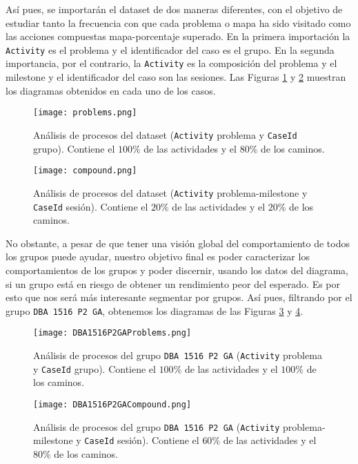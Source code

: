 Así pues, se importarán el dataset de dos maneras diferentes, con el objetivo de estudiar tanto la frecuencia con que cada problema o mapa ha sido visitado como las acciones compuestas mapa-porcentaje superado. En la primera importación la \texttt{Activity} es el problema y el identificador del caso es el grupo. En la segunda importancia, por el contrario, la \texttt{Activity} es la composición del problema y el milestone y el identificador del caso son las sesiones. Las Figuras \ref{fig:problems} y \ref{fig:compound} muestran los diagramas obtenidos en cada uno de los casos.

\begin{figure}[H]
    \centering
    \texttt{[image: problems.png]}
    \caption{Análisis de procesos del dataset (\texttt{Activity} problema y \texttt{CaseId} grupo). Contiene el $100\%$ de las actividades y el $80\%$ de los caminos.}
    \label{fig:problems}
\end{figure}

\begin{figure}[H]
    \centering
    \texttt{[image: compound.png]}
    \caption{Análisis de procesos del dataset (\texttt{Activity} problema-milestone y \texttt{CaseId} sesión). Contiene el $20\%$ de las actividades y el $20\%$ de los caminos.}
    \label{fig:compound}
\end{figure}

No obstante, a pesar de que tener una visión global del comportamiento de todos los grupos puede ayudar, nuestro objetivo final es poder caracterizar los comportamientos de los grupos y poder discernir, usando los datos del diagrama, si un grupo está en riesgo de obtener un rendimiento peor del esperado. Es por esto que nos será más interesante segmentar por grupos. Así pues, filtrando por el grupo \texttt{DBA 1516 P2 GA}, obtenemos los diagramas de las Figuras \ref{fig:problemsDBA1516P2GA} y \ref{fig:compoundDBA1516P2GA}.

\begin{figure}[H]
    \centering
    \texttt{[image: DBA1516P2GAProblems.png]}
    \caption{Análisis de procesos del grupo \texttt{DBA 1516 P2 GA} (\texttt{Activity} problema y \texttt{CaseId} grupo). Contiene el $100\%$ de las actividades y el $100\%$ de los caminos.}
    \label{fig:problemsDBA1516P2GA}
\end{figure}

\begin{figure}[H]
    \centering
    \texttt{[image: DBA1516P2GACompound.png]}
    \caption{Análisis de procesos del grupo \texttt{DBA 1516 P2 GA} (\texttt{Activity} problema-milestone y \texttt{CaseId} sesión). Contiene el $60\%$ de las actividades y el $80\%$ de los caminos.}
    \label{fig:compoundDBA1516P2GA}
\end{figure}

